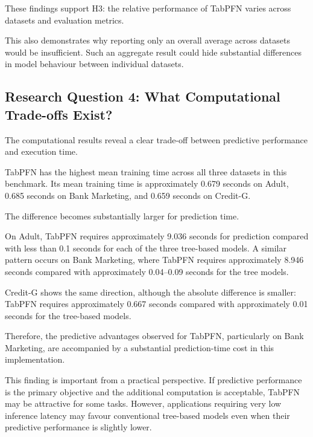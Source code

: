 These findings support H3: the relative performance of TabPFN varies across datasets and evaluation metrics.



This also demonstrates why reporting only an overall average across datasets would be insufficient. Such an aggregate result could hide substantial differences in model behaviour between individual datasets.



\subsection{Research Question 4: What Computational Trade-offs Exist?}



The computational results reveal a clear trade-off between predictive performance and execution time.



TabPFN has the highest mean training time across all three datasets in this benchmark. Its mean training time is approximately 0.679 seconds on Adult, 0.685 seconds on Bank Marketing, and 0.659 seconds on Credit-G.



The difference becomes substantially larger for prediction time.



On Adult, TabPFN requires approximately 9.036 seconds for prediction compared with less than 0.1 seconds for each of the three tree-based models. A similar pattern occurs on Bank Marketing, where TabPFN requires approximately 8.946 seconds compared with approximately 0.04–0.09 seconds for the tree models.



Credit-G shows the same direction, although the absolute difference is smaller: TabPFN requires approximately 0.667 seconds compared with approximately 0.01 seconds for the tree-based models.



Therefore, the predictive advantages observed for TabPFN, particularly on Bank Marketing, are accompanied by a substantial prediction-time cost in this implementation.



This finding is important from a practical perspective. If predictive performance is the primary objective and the additional computation is acceptable, TabPFN may be attractive for some tasks. However, applications requiring very low inference latency may favour conventional tree-based models even when their predictive performance is slightly lower.



